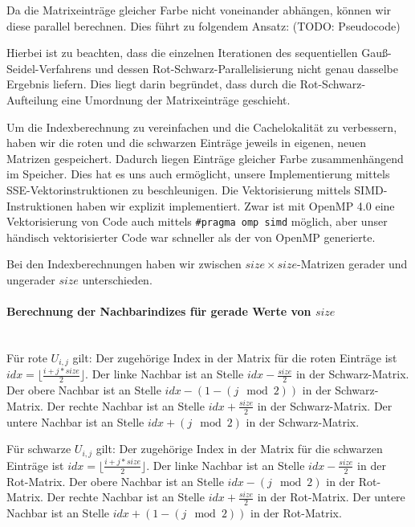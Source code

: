 \documentclass{article}
\begin{document}
Da die Matrixeinträge gleicher Farbe nicht voneinander abhängen, können wir diese parallel berechnen. Dies führt zu folgendem Ansatz: (TODO: Pseudocode)

Hierbei ist zu beachten, dass die einzelnen Iterationen des sequentiellen Gauß-Seidel-Verfahrens und dessen Rot-Schwarz-Parallelisierung nicht genau dasselbe Ergebnis liefern. Dies liegt darin begründet, dass durch die Rot-Schwarz-Aufteilung eine Umordnung der Matrixeinträge geschieht.

Um die Indexberechnung zu vereinfachen und die Cachelokalität zu verbessern, haben wir die roten und die schwarzen Einträge jeweils in eigenen, neuen Matrizen gespeichert. Dadurch liegen Einträge gleicher Farbe zusammenhängend im Speicher. Dies hat es uns auch ermöglicht, unsere Implementierung mittels SSE-Vektorinstruktionen zu beschleunigen. Die Vektorisierung mittels SIMD-Instruktionen haben wir explizit implementiert. Zwar ist mit OpenMP 4.0 eine Vektorisierung von Code auch mittels \texttt{\#pragma omp simd} möglich, aber unser händisch vektorisierter Code war schneller als der von OpenMP generierte.

Bei den Indexberechnungen haben wir zwischen $size \times size$-Matrizen gerader und ungerader $size$ unterschieden.

\paragraph{Berechnung der Nachbarindizes für gerade Werte von $size$}~\\
Für rote $U_{i,j}$ gilt: Der zugehörige Index in der Matrix für die roten Einträge ist $idx = \lfloor\frac{i+j*size}{2}\rfloor$. Der linke Nachbar ist an Stelle $idx - \frac{size}{2}$ in der Schwarz-Matrix. Der obere Nachbar ist an Stelle $idx - (1-(j \mod 2))$ in der Schwarz-Matrix. Der rechte Nachbar ist an Stelle $idx + \frac{size}{2}$ in der Schwarz-Matrix. Der untere Nachbar ist an Stelle $idx + (j \mod 2)$ in der Schwarz-Matrix.



Für schwarze $U_{i,j}$ gilt: Der zugehörige Index in der Matrix für die schwarzen Einträge ist $idx = \lfloor\frac{i+j*size}{2}\rfloor$. Der linke Nachbar ist an Stelle $idx - \frac{size}{2}$ in der Rot-Matrix. Der obere Nachbar ist an Stelle $idx - (j \mod 2)$ in der Rot-Matrix. Der rechte Nachbar ist an Stelle $idx + \frac{size}{2}$ in der Rot-Matrix. Der untere Nachbar ist an Stelle $idx + (1- (j \mod 2))$ in der Rot-Matrix.
\end{document}
